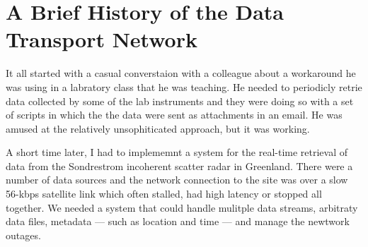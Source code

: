 \chapter{A Brief History of the Data Transport Network}
\label{history}

It all started with a casual converstaion with a colleague about a
workaround he was using in a labratory class that he was teaching. He
needed to periodicly retrie data collected by some of the lab instruments
and they were doing so with a set of scripts in which the the data
were sent as attachments in an email. He was amused at the relatively
unsophiticated approach, but it was working.

A short time later, I had to implememnt a system for the real-time
retrieval of data from the Sondrestrom incoherent scatter radar in
Greenland. There were a number of data sources and the network connection
to the site was over a slow 56-kbps satellite link which often stalled,
had high latency or stopped all together. We needed a system that could
handle mulitple data streams, arbitraty data files, metadata 
--- such as location and time --- and manage the newtwork outages.




